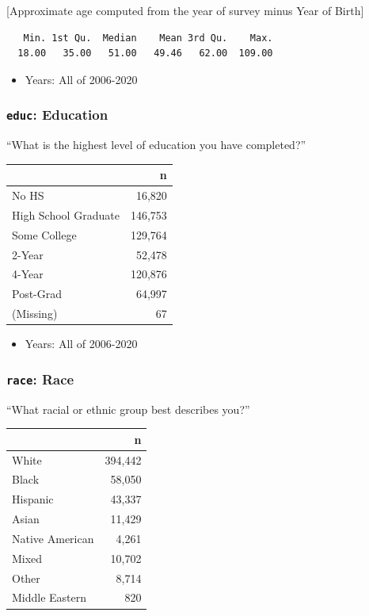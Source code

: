 \documentclass[10pt,article,oneside]{memoir}
\theoremstyle{definition}
\begin{document}
{[}Approximate age computed from the year of survey minus Year of
Birth{]}

\begin{verbatim}
   Min. 1st Qu.  Median    Mean 3rd Qu.    Max. 
  18.00   35.00   51.00   49.46   62.00  109.00 
\end{verbatim}

\begin{itemize}
\tightlist
\item
  Years: All of 2006-2020
\end{itemize}

\hypertarget{educ-education}{%
\subsubsection{\texorpdfstring{\texttt{educ}:
Education}{educ: Education}}\label{educ-education}}

``What is the highest level of education you have completed?''

\begin{table}[H]
\centering
\begin{tabular}{lr}
\toprule
 & n\\
\midrule
No HS & 16,820\\
High School Graduate & 146,753\\
Some College & 129,764\\
2-Year & 52,478\\
4-Year & 120,876\\
Post-Grad & 64,997\\
(Missing) & 67\\
\bottomrule
\end{tabular}
\end{table}

\begin{itemize}
\tightlist
\item
  Years: All of 2006-2020
\end{itemize}

\hypertarget{race-race}{%
\subsubsection{\texorpdfstring{\texttt{race}:
Race}{race: Race}}\label{race-race}}

``What racial or ethnic group best describes you?''

\begin{table}[H]
\centering
\begin{tabular}{lr}
\toprule
 & n\\
\midrule
White & 394,442\\
Black & 58,050\\
Hispanic & 43,337\\
Asian & 11,429\\
Native American & 4,261\\
Mixed & 10,702\\
Other & 8,714\\
Middle Eastern & 820\\
\bottomrule
\end{tabular}
\end{table}
\end{document}
